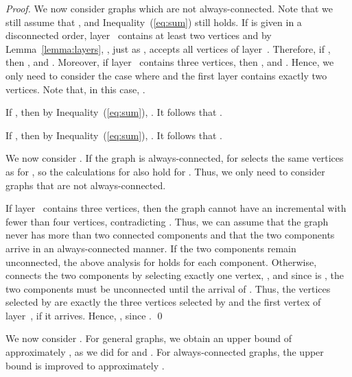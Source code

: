 \begin{proof}
We now consider graphs which are not always-connected.
Note that we still assume that , and
Inequality~(\ref{eq:sum}) still holds.
If  is given in a disconnected order, layer~ contains at least
two vertices and by Lemma~\ref{lemma:layers}, \onopt, just as
\alayersparent, accepts all vertices of layer~. 
Therefore, if , then , and
. 
Moreover, if layer~ contains three vertices,
then , and . 
Hence, we only need to consider the case where  and the
first layer contains exactly two vertices.
Note that, in this case, .

If , then by Inequality~(\ref{eq:sum}),
.
It follows that .

If , then by Inequality~(\ref{eq:sum}),
.
It follows that .

We now consider \cds.
If the graph is always-connected, \alayersparent for \cds selects the same
vertices as for \ds, so the calculations for \ds also hold for \cds.
Thus, we only need to consider graphs that are not always-connected.

If layer~ contains three vertices, then the graph cannot have an
 incremental \cds with fewer than four vertices, contradicting 
.
Thus, we can assume that the graph never has more than two connected
components and that the two components arrive in an always-connected
manner. 
If the two components remain unconnected, the above analysis for \ds
holds for each component.
Otherwise, 
\onopt connects the two components by
selecting exactly one vertex, , and since \onopt is \incr, the
two components must be unconnected until the arrival of .
Thus, the vertices selected by \alayersparent are exactly the three
vertices selected by \onopt and the first vertex of layer~, if it
arrives.
Hence, , since
.
\qed\end{proof}

We now consider \tds.
For general graphs, we obtain an upper bound of approximately ,
as we did for \ds and \cds.
For always-connected graphs, the upper bound is improved to
approximately .

